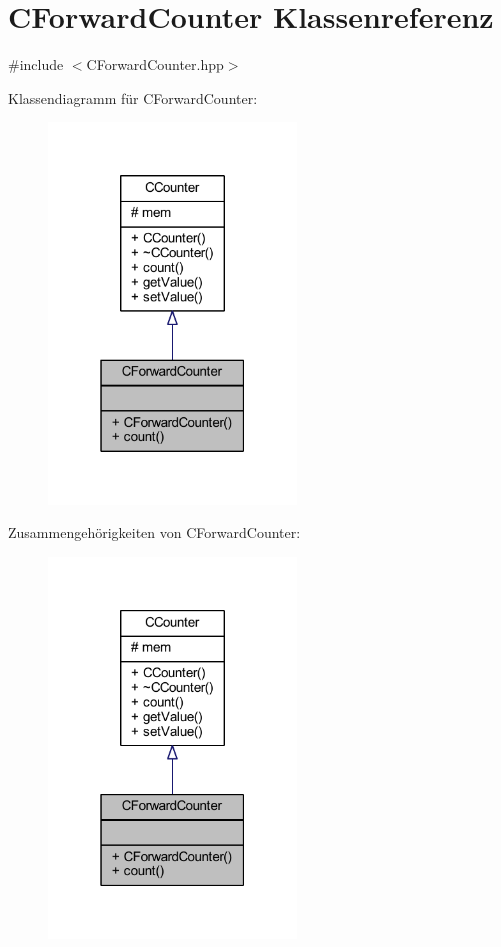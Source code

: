 \hypertarget{class_c_forward_counter}{}\section{C\+Forward\+Counter Klassenreferenz}
\label{class_c_forward_counter}


{\ttfamily \#include $<$C\+Forward\+Counter.\+hpp$>$}



Klassendiagramm für C\+Forward\+Counter\+:\nopagebreak
\begin{figure}[H]
\begin{center}
\leavevmode
\includegraphics[width=187pt]{class_c_forward_counter__inherit__graph}
\end{center}
\end{figure}


Zusammengehörigkeiten von C\+Forward\+Counter\+:\nopagebreak
\begin{figure}[H]
\begin{center}
\leavevmode
\includegraphics[width=187pt]{class_c_forward_counter__coll__graph}
\end{center}
\end{figure}
